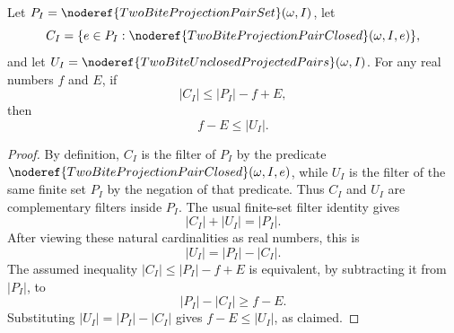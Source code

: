 \begin{helper}
Let \(P_I=\noderef{TwoBiteProjectionPairSet}(\omega,I)\), let
\[
C_I=\{e\in P_I:\noderef{TwoBiteProjectionPairClosed}(\omega,I,e)\},
\]
and let \(U_I=\noderef{TwoBiteUnclosedProjectedPairs}(\omega,I)\).  For any
real numbers \(f\) and \(E\), if
\[
|C_I|\le |P_I|-f+E,
\]
then
\[
f-E\le |U_I|.
\]
\end{helper}
\begin{proof}
By definition, \(C_I\) is the filter of \(P_I\) by the predicate
\(\noderef{TwoBiteProjectionPairClosed}(\omega,I,e)\), while \(U_I\) is the
filter of the same finite set \(P_I\) by the negation of that predicate.
Thus \(C_I\) and \(U_I\) are complementary filters inside \(P_I\).  The usual
finite-set filter identity gives
\[
|C_I|+|U_I|=|P_I|.
\]
After viewing these natural cardinalities as real numbers, this is
\[
|U_I|=|P_I|-|C_I|.
\]
The assumed inequality \(|C_I|\le |P_I|-f+E\) is equivalent, by subtracting
it from \(|P_I|\), to
\[
|P_I|-|C_I|\ge f-E.
\]
Substituting \(|U_I|=|P_I|-|C_I|\) gives \(f-E\le |U_I|\), as claimed.
\end{proof}

